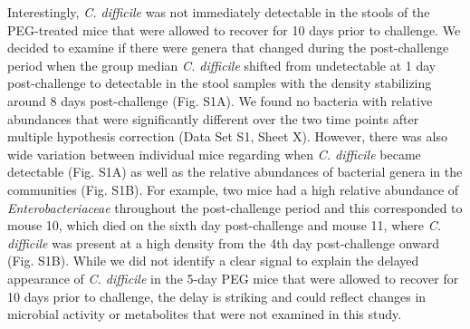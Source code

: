 \documentclass[
  11pt,
]{article}
\begin{document}
Interestingly, \emph{C. difficile} was not immediately detectable in the
stools of the PEG-treated mice that were allowed to recover for 10 days
prior to challenge. We decided to examine if there were genera that
changed during the post-challenge period when the group median \emph{C.
difficile} shifted from undetectable at 1 day post-challenge to
detectable in the stool samples with the density stabilizing around 8
days post-challenge (Fig. S1A). We found no bacteria with relative
abundances that were significantly different over the two time points
after multiple hypothesis correction (Data Set S1, Sheet X). However,
there was also wide variation between individual mice regarding when
\emph{C. difficile} became detectable (Fig. S1A) as well as the relative
abundances of bacterial genera in the communities (Fig. S1B). For
example, two mice had a high relative abundance of
\emph{Enterobacteriaceae} throughout the post-challenge period and this
corresponded to mouse 10, which died on the sixth day post-challenge and
mouse 11, where \emph{C. difficile} was present at a high density from
the 4th day post-challenge onward (Fig. S1B). While we did not identify
a clear signal to explain the delayed appearance of \emph{C. difficile}
in the 5-day PEG mice that were allowed to recover for 10 days prior to
challenge, the delay is striking and could reflect changes in microbial
activity or metabolites that were not examined in this study.
\end{document}
